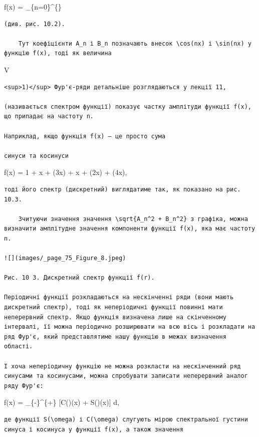 \documentclass[
  ukrainian,
]{article}
\begin{document}
f(x) = \sum\_\{n=0\}\^{}\{\infty\}

\begin{verbatim}
(див. рис. 10.2).

    Тут коефіцієнти A_n і B_n позначають внесок \cos(nx) і \sin(nx) у функцію f(x), тоді як величина
\end{verbatim}

V

\begin{verbatim}
<sup>1)</sup> Фур'є-ряди детальніше розглядаються у лекції 11,

(називається спектром функції) показує частку амплітуди функції f(x), що припадає на частоту n.

Наприклад, якщо функція f(x) — це просто сума

синуси та косинуси
\end{verbatim}

f(x) = 1 + \sin x + \sin(3x) + \cos x + \cos(2x) +
\cos(4x),

\begin{verbatim}
тоді його спектр (дискретний) виглядатиме так, як показано на рис. 10.3.

    Зчитуючи значення значення \sqrt{A_n^2 + B_n^2} з графіка, можна визначити амплітудне значення компоненти функції f(x), яка має частоту n.

![](images/_page_75_Figure_8.jpeg)

Рис. 10 3. Дискретний спектр функції f(r).

Періодичні функції розкладаються на нескінченні ряди (вони мають дискретний спектр), тоді як неперіодичні функції повинні мати неперервний спектр. Якщо функція визначена лише на скінченному інтервалі, її можна періодично розширювати на всю вісь і розкладати на ряд Фур'є, який представлятиме нашу функцію в межах визначення області.

І хоча неперіодичну функцію не можна розкласти на нескінченний ряд синусами та косинусами, можна спробувати записати неперервний аналог ряду Фур'є:
\end{verbatim}

f(x) = \int\_\{-\infty\}\^{}\{+\infty\} {[}C(\omega)\cos(\omega x) +
S(\omega)\sin(\omega x){]} d\omega,

\begin{verbatim}
де функції S(\omega) і C(\omega) слугують мірою спектральної густини синуса і косинуса у функції f(x), а також значення
\end{verbatim}
\end{document}

